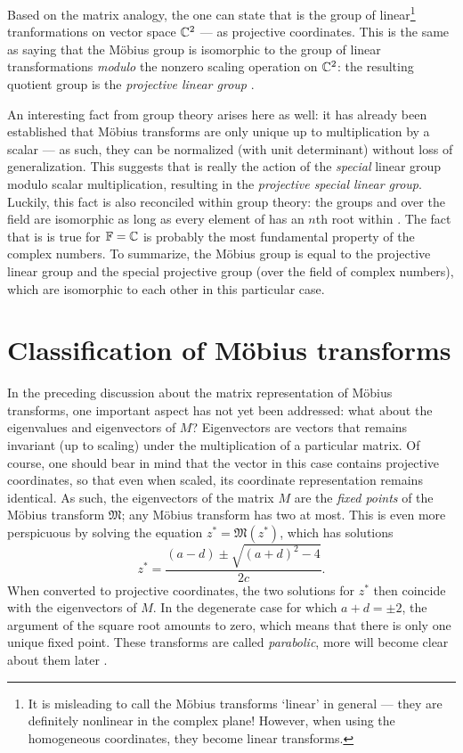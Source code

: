 Based on the matrix analogy, the one can state that \moebiusgroup is the group of linear\footnote{It is misleading to call the Möbius transforms `linear' in general --- they are definitely nonlinear in the complex plane! However, when using the homogeneous coordinates, they become linear transforms.} tranformations on vector space \(\mathbb{C}^2\) --- as projective coordinates. This is the same as saying that the Möbius group is isomorphic to the group of linear transformations \emph{modulo} the nonzero scaling operation on \(\mathbb{C}^2\): the resulting quotient group is the \emph{projective linear group} .

An interesting fact from group theory arises here as well: it has already been established that Möbius transforms are only unique up to multiplication by a scalar --- as such, they can be normalized (with unit determinant) without loss of generalization. This suggests that \moebiusgroup is really the action of the \emph{special} linear group modulo scalar multiplication, resulting in the \emph{projective special linear group}. Luckily, this fact is also reconciled within group theory: the groups  and  over the field \field are isomorphic as long as every element of \field has an \(n\)th root within \field. The fact that is is true for \(\mathbb{F} = \mathbb{C}\) is probably the most fundamental property of the complex numbers. To summarize, the Möbius group \moebiusgroup is equal to the projective linear group and the special projective group (over the field of complex numbers), which are isomorphic to each other in this particular case.

\section{Classification of Möbius transforms}
In the preceding discussion about the matrix representation of Möbius transforms, one important aspect has not yet been addressed: what about the eigenvalues and eigenvectors of \(M\)? Eigenvectors are vectors that remains invariant (up to scaling) under the multiplication of a particular matrix. Of course, one should bear in mind that the vector in this case contains projective coordinates, so that even when scaled, its coordinate representation remains identical. As such, the eigenvectors of the matrix \(M\) are the \emph{fixed points} of the Möbius transform \(\mathfrak{M}\); any Möbius transform has two at most. This is even more perspicuous by solving the equation \(z^* = \mathfrak{M}(z^*)\), which has solutions
\[ z^* = \frac{(a - d) \pm \sqrt{(a + d)^2 - 4}}{2c}.\]
When converted to projective coordinates, the two solutions for \(z^*\) then coincide with the eigenvectors of \(M\). In the degenerate case for which \(a + d = \pm2\), the argument of the square root amounts to zero, which means that there is only one unique fixed point. These transforms are called \emph{parabolic}, more will become clear about them later \cite{Needham1997}.

